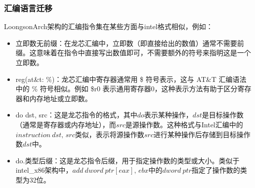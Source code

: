 \documentclass[UTF8]{ctexart}
\begin{document}
		\subsubsection{汇编语言迁移} %
		LoongsonArch架构的汇编指令集在某些方面与intel格式相似，例如：
			\begin{itemize}[leftmargin=3.5em]
				\item 立即数无前缀：在龙芯汇编中，立即数（即直接给出的数值）通常不需要前缀。这意味着在指令中直接写出数值即可，不需要额外的符号来指明这是一个立即数。
   				\item reg(at\&t: \%)：龙芯汇编中寄存器通常用 \$ 符号表示，这与 AT\&T 汇编语法中的 \% 符号相似。例如 \$r0 表示通用寄存器0，这种表示方法有助于区分寄存器和内存地址或立即数。
    				\item do dst, src：这是龙芯指令的格式，其中$ do $表示某种操作，$ dst  $是目标操作数（通常是寄存器或内存地址），而$ src $是源操作数。这种格式与Intel汇编中的$ instruction\:dst,\,src $类似，表示将源操作数$ src $进行某种操作后存储到目标操作数$ dst $中。
    				\item do.类型后缀：这是龙芯指令后缀，用于指定操作数的类型或大小。类似于intel\_x86架构中，$ add \:dword \:ptr[eax],\,ebx $中的$ dword\:ptr $指定了操作数的类型为32位。
			\end{itemize}
\end{document}
